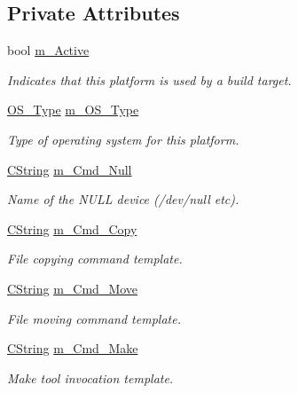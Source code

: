 \subsection*{Private Attributes}
\begin{DoxyCompactItemize}
\item 
bool \hyperlink{classCPlatform_aa2d970af453e1e55b857e149c03f2d4e}{m\-\_\-\-Active}
\begin{DoxyCompactList}\small\item\em Indicates that this platform is used by a build target. \end{DoxyCompactList}\item 
\hyperlink{classCPlatform_a2fb735c63c53052f79629e338bb0f535}{O\-S\-\_\-\-Type} \hyperlink{classCPlatform_a7ca30334ae5baa1adf6b77ffc1e7daac}{m\-\_\-\-O\-S\-\_\-\-Type}
\begin{DoxyCompactList}\small\item\em Type of operating system for this platform. \end{DoxyCompactList}\item 
\hyperlink{classCString}{C\-String} \hyperlink{classCPlatform_afb66cacc7cfde738d92ff375111ed4af}{m\-\_\-\-Cmd\-\_\-\-Null}
\begin{DoxyCompactList}\small\item\em Name of the N\-U\-L\-L device (/dev/null etc). \end{DoxyCompactList}\item 
\hyperlink{classCString}{C\-String} \hyperlink{classCPlatform_af87b0091e9dcee0e979d88ce2e236c3e}{m\-\_\-\-Cmd\-\_\-\-Copy}
\begin{DoxyCompactList}\small\item\em File copying command template. \end{DoxyCompactList}\item 
\hyperlink{classCString}{C\-String} \hyperlink{classCPlatform_a97a7eacf6ecb3b7ccfa23cd5d3ef315a}{m\-\_\-\-Cmd\-\_\-\-Move}
\begin{DoxyCompactList}\small\item\em File moving command template. \end{DoxyCompactList}\item 
\hyperlink{classCString}{C\-String} \hyperlink{classCPlatform_aff4c666f1118e9bf8988eb5e0e57c47e}{m\-\_\-\-Cmd\-\_\-\-Make}
\begin{DoxyCompactList}\small\item\em Make tool invocation template. \end{DoxyCompactList}\item 

\end{DoxyCompactItemize}
